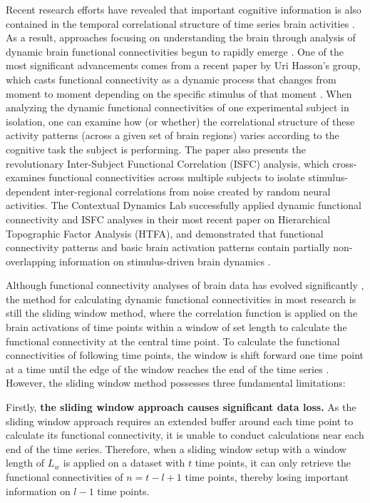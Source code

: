 \documentclass[11pt]{article}
\begin{document}
Recent research efforts have revealed that important cognitive information is also contained in the temporal correlational structure of time series brain activities \citep{davidson2016}. As a result, approaches focusing on understanding the brain through analysis of dynamic brain functional connectivities begun to rapidly emerge \citep{Nigam2016,Hutchinson2013}. One of the most significant advancements comes from a recent paper by Uri Hasson's group, which casts functional connectivity as a dynamic process that changes from moment to moment depending on the specific stimulus of that moment \citep{hasson2016}. When analyzing the dynamic functional connectivities of one experimental subject in isolation, one can examine how (or whether) the correlational structure of these activity patterns (across a given set of brain regions) varies according to the cognitive task the subject is performing. The paper also presents the revolutionary Inter-Subject Functional Correlation (ISFC) analysis, which cross-examines functional connectivities across multiple subjects to isolate stimulus-dependent inter-regional correlations from noise created by random neural activities. The Contextual Dynamics Lab successfully applied dynamic functional connectivity and ISFC analyses in their most recent paper on Hierarchical Topographic Factor Analysis (HTFA), and demonstrated that functional connectivity patterns and basic brain activation patterns contain partially non-overlapping information on stimulus-driven brain dynamics \citep{jeremy2017}.

Although functional connectivity analyses of brain data has evolved significantly \citep{olaf2005,khambhati2017}, the method for calculating dynamic functional connectivities in most research is still the sliding window method, where the correlation function is applied on the brain activations of time points within a window of set length to calculate the functional connectivity at the central time point. To calculate the functional connectivities of following time points, the window is shift forward one time point at a time until the edge of the window reaches the end of the time series \citep{enrico2011,elena2012}. However, the sliding window method possesses three fundamental limitations:

Firstly, \textbf{the sliding window approach causes significant data loss.} As the sliding window approach requires an extended buffer around each time point to calculate its functional connectivity, it is unable to conduct calculations near each end of the time series. Therefore, when a sliding window setup with a window length of $L_w$ is applied on a dataset with $t$ time points, it can only retrieve the functional connectivities of $n=t-l+1$ time points, thereby losing important information on $l-1$ time points.
\end{document}

